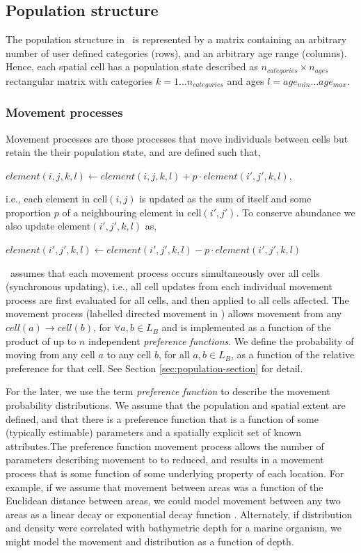 \subsection{Population structure}

The population structure in \SPM\ is represented by a matrix containing an arbitrary number of user defined categories (rows), and an arbitrary age range (columns). Hence, each spatial cell has a population state described as $n_{categories} \times n_{ages}$ rectangular matrix with categories $k=1 \ldots n_{categories}$ and ages $l=age_{min} \ldots age_{max}$. 

\subsubsection*{Movement processes}

Movement processes are those processes that move individuals between cells but retain the their population state, and are defined such that,

$element(i,j,k,l)\leftarrow element(i,j,k,l) + p \cdot element(i',j',k,l)$,

i.e., each element in cell$(i,j)$ is updated as the sum of itself and some proportion $p$ of a neighbouring element in cell$(i',j')$. To conserve abundance we also update element$(i',j',k,l)$ as,

$element(i',j',k,l)\leftarrow element(i',j',k,l) - p\cdot element(i',j',k,l)$

\SPM\ assumes that each movement process occurs simultaneously over all cells (synchronous updating), i.e., all cell updates from each individual movement process are first evaluated for all cells, and then applied to all cells affected. The movement process (labelled directed movement in \SPM) allows movement from any $cell(a) \rightarrow cell(b)$, for $\forall a,b \in L_B$ and is implemented as a function of the product of up to $n$ independent \emph{preference functions}. We define the probability of moving from any cell $a$ to any cell $b$, for all $a,b \in L_B$, as a function of the relative preference for that cell. See Section \ref{sec:population-section} for detail.

For the later, we use the term \emph{preference function} \citep{1366,1367} to describe the movement probability distributions. We assume that the population and spatial extent are defined, and that there is a preference function that is a function of some (typically estimable) parameters and a spatially explicit set of known attributes.The preference function movement process allows the number of parameters describing movement to to reduced, and results in a movement process that is some function of some underlying property of each location. For example, if we assume that movement between areas was a function of the Euclidean distance between areas, we could model movement between any two areas as a linear decay or exponential decay function \citep{1366}. Alternately, if distribution and density were correlated with bathymetric depth for a marine organism, we might model the movement and distribution as a function of depth. 

